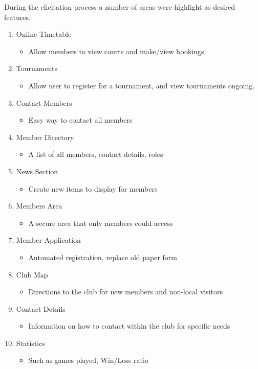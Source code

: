 During the elicitation process a number of areas were highlight as desired features.

\begin{enumerate}
\item Online Timetable
\begin{itemize}
\item Allow members to view courts and make/view bookings
\end{itemize}
\item Tournaments
\begin{itemize}
\item Allow user to register for a tournament, and view tournaments ongoing.
\end{itemize}
\item Contact Members
\begin{itemize}
\item Easy way to contact all members
\end{itemize}
\item Member Directory
\begin{itemize}
\item A list of all members, contact details, roles
\end{itemize}
\item News Section
\begin{itemize}
\item Create new items to display for members
\end{itemize}
\item Members Area
\begin{itemize}
\item A secure area that only members could access
\end{itemize}
\item Member Application
\begin{itemize}
\item Automated registration, replace old paper form
\end{itemize}
\item Club Map
\begin{itemize}
\item Directions to the club for new members and non-local visitors
\end{itemize}
\newpage
\item Contact Details
\begin{itemize}
\item Information on how to contact within the club for specific needs
\end{itemize}
\item Statistics
\begin{itemize}
\item Such as games played, Win/Loss ratio
\end{itemize}
\end{enumerate}
